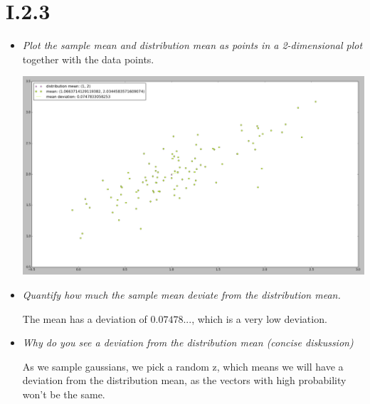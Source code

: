 \documentclass[12pt, a4paper]{article}
\begin{document}
\section{I.2.3}
\begin{itemize}
\item \textit{Plot the sample mean and distribution mean as points in a 2-dimensional plot}
together with the data points.

\includegraphics[width=\textwidth]{3.png}
\item \textit{Quantify how much the sample mean deviate from the distribution mean.}

The mean has a deviation of $0.07478...$, which is a very low deviation.

\item \textit{Why do you see a deviation from the distribution mean (concise diskussion)}

As we sample gaussians, we pick a random z, which means we will have a deviation from the distribution mean, as the vectors with high probability won't be the same.
\end{itemize}
\end{document}

